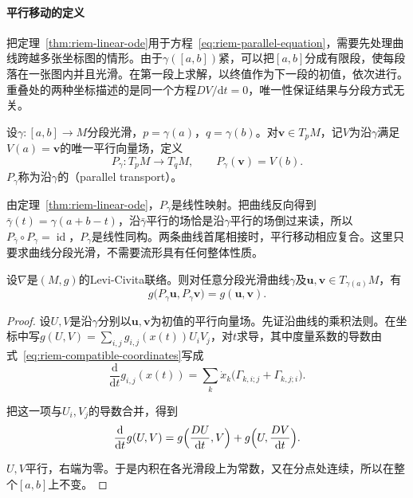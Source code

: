 \paragraph{平行移动的定义}
把定理~\ref{thm:riem-linear-ode}用于方程~\eqref{eq:riem-parallel-equation}，需要先处理曲线跨越多张坐标图的情形。由于$\gamma([a,b])$紧，可以把$[a,b]$分成有限段，使每段落在一张图内并且光滑。在第一段上求解，以终值作为下一段的初值，依次进行。重叠处的两种坐标描述的是同一个方程$DV/\mathrm dt=0$，唯一性保证结果与分段方式无关。

\begin{definition}[平行移动]
\label{def:riem-parallel-transport}
设$\gamma:[a,b]\to M$分段光滑，$p=\gamma(a)$，$q=\gamma(b)$。对$\bm v\in T_pM$，记$V$为沿$\gamma$满足$V(a)=\bm v$的唯一平行向量场，定义
\begin{equation}
P_\gamma:T_pM\to T_qM,\qquad P_\gamma(\bm v)=V(b).
\label{eq:riem-parallel-transport}
\end{equation}
$P_\gamma$称为沿$\gamma$的（parallel transport）。
\end{definition}

由定理~\ref{thm:riem-linear-ode}，$P_\gamma$是线性映射。把曲线反向得到$\bar\gamma(t)=\gamma(a+b-t)$，沿$\bar\gamma$平行的场恰是沿$\gamma$平行的场倒过来读，所以$P_{\bar\gamma}\circ P_\gamma=\operatorname{id}$，$P_\gamma$是线性同构。两条曲线首尾相接时，平行移动相应复合。这里只要求曲线分段光滑，不需要流形具有任何整体性质。

\begin{theorem}[平行移动保持内积]
\label{thm:riem-transport-isometry}
设$\nabla$是$(M,g)$的Levi-Civita联络。则对任意分段光滑曲线$\gamma$及$\bm u,\bm v\in T_{\gamma(a)}M$，有
\begin{equation}
g\bigl(P_\gamma\bm u,P_\gamma\bm v\bigr)=g(\bm u,\bm v).
\label{eq:riem-transport-isometry}
\end{equation}
\end{theorem}

\begin{proof}
设$U,V$是沿$\gamma$分别以$\bm u,\bm v$为初值的平行向量场。先证沿曲线的乘积法则。在坐标中写$g(U,V)=\sum_{i,j}g_{i,j}(x(t))U_iV_j$，对$t$求导，其中度量系数的导数由式~\eqref{eq:riem-compatible-coordinates}写成
\[
\frac{\mathrm d}{\mathrm dt}g_{i,j}(x(t))=\sum_k\dot x_k\bigl(\Gamma_{k,i;j}+\Gamma_{k,j;i}\bigr).
\]

把这一项与$U_i,V_j$的导数合并，得到
\[
\frac{\mathrm d}{\mathrm dt}g(U,V)=g\Bigl(\frac{DU}{\mathrm dt},V\Bigr)+g\Bigl(U,\frac{DV}{\mathrm dt}\Bigr).
\]

$U,V$平行，右端为零。于是内积在各光滑段上为常数，又在分点处连续，所以在整个$[a,b]$上不变。
\end{proof}

